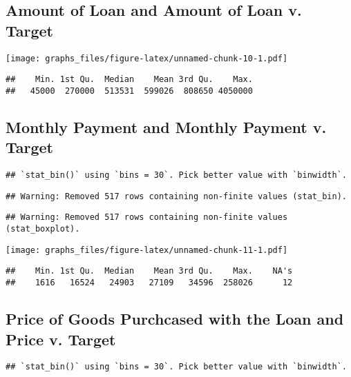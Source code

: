 \documentclass[]{article}
\begin{document}
\subsection{Amount of Loan and Amount of Loan v.
Target}\label{amount-of-loan-and-amount-of-loan-v.-target}

\texttt{[image: graphs\_files/figure-latex/unnamed-chunk-10-1.pdf]}

\begin{verbatim}
##    Min. 1st Qu.  Median    Mean 3rd Qu.    Max. 
##   45000  270000  513531  599026  808650 4050000
\end{verbatim}

\subsection{Monthly Payment and Monthly Payment v.
Target}\label{monthly-payment-and-monthly-payment-v.-target}

\begin{verbatim}
## `stat_bin()` using `bins = 30`. Pick better value with `binwidth`.
\end{verbatim}

\begin{verbatim}
## Warning: Removed 517 rows containing non-finite values (stat_bin).
\end{verbatim}

\begin{verbatim}
## Warning: Removed 517 rows containing non-finite values (stat_boxplot).
\end{verbatim}

\texttt{[image: graphs\_files/figure-latex/unnamed-chunk-11-1.pdf]}

\begin{verbatim}
##    Min. 1st Qu.  Median    Mean 3rd Qu.    Max.    NA's 
##    1616   16524   24903   27109   34596  258026      12
\end{verbatim}

\subsection{Price of Goods Purchcased with the Loan and Price v.
Target}\label{price-of-goods-purchcased-with-the-loan-and-price-v.-target}

\begin{verbatim}
## `stat_bin()` using `bins = 30`. Pick better value with `binwidth`.
\end{verbatim}
\end{document}
